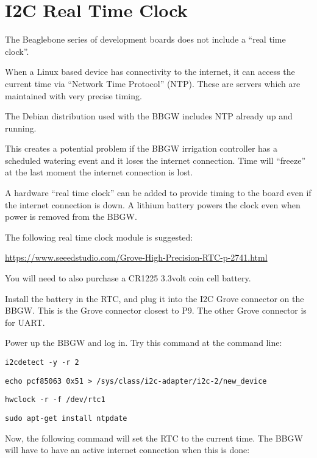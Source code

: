 \chapter{I2C Real Time Clock}

The Beaglebone series of development boards does not include a ``real time clock''.

When a Linux based device has connectivity to the internet, it can access the current time via ``Network Time Protocol'' (NTP).  These are servers which are maintained with very precise timing.

The Debian distribution used with the BBGW includes NTP already up and running.

This creates a potential problem if the BBGW irrigation controller has a scheduled watering event and it loses the internet connection.  Time will ``freeze'' at the last moment the internet connection is lost.

A hardware ``real time clock'' can be added to provide timing to the board even if the internet connection is down.  A lithium battery powers the clock even when power is removed from the BBGW.

The following real time clock module is suggested:

\url{https://www.seeedstudio.com/Grove-High-Precision-RTC-p-2741.html}

You will need to also purchase a CR1225 3.3volt coin cell battery.

Install the battery in the RTC, and plug it into the I2C Grove connector on the BBGW.  This is the Grove connector closest to P9.  The other Grove connector is for UART.

Power up the BBGW and log in.  Try this command at the command line:

\begin{verbatim}
i2cdetect -y -r 2
\end{verbatim}

\begin{verbatim}
echo pcf85063 0x51 > /sys/class/i2c-adapter/i2c-2/new_device
\end{verbatim}

\begin{verbatim}
hwclock -r -f /dev/rtc1
\end{verbatim}

\begin{verbatim}
sudo apt-get install ntpdate
\end{verbatim}

Now, the following command will set the RTC to the current time.  The BBGW will have to have an active internet connection when this is done:

